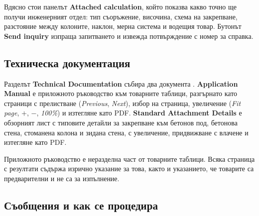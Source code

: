 Вдясно стои панелът \textbf{Attached calculation}, който показва какво точно ще получи
инженерният отдел: тип съоръжение, височина, схема на закрепване, разстояние между
колоните, наклон, мерна система и водещия товар. Бутонът \textbf{Send inquiry} изпраща
запитването и извежда потвърждение с номер за справка.

\subsection{Техническа документация}
\label{subsec:ug-docs}

Разделът \textbf{Technical Documentation} събира два документа
. \textbf{Application Manual} е приложното ръководство към товарните
таблици, разгърнато като страници с прелистване (\emph{Previous}, \emph{Next}), избор на
страница, увеличение (\emph{Fit page}, $+$, $-$, \emph{100\%}) и изтегляне като PDF.
\textbf{Standard Attachment Details} е обзорният лист с типовите детайли за закрепване
към бетонов под, бетонова стена, стоманена колона и зидана стена, с увеличение,
придвижване с влачене и изтегляне като PDF.


Приложното ръководство е неразделна част от товарните таблици. Всяка страница с
резултати съдържа изрично указание за това, както и указанието, че товарите са
предварителни и не са за изпълнение.

\subsection{Съобщения и как се процедира}
\label{subsec:ug-messages}

